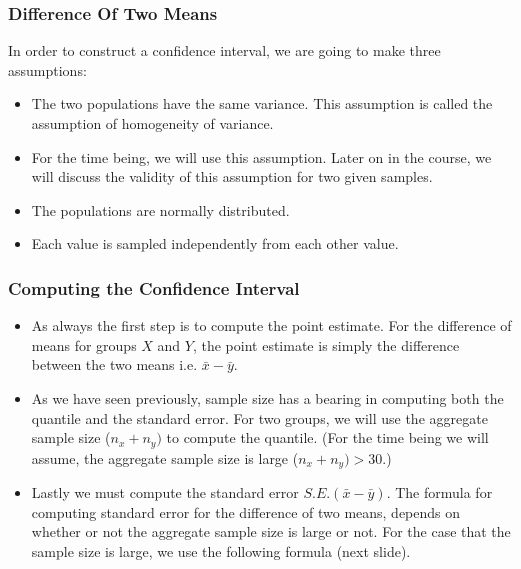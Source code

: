 \begin{frame}
\frametitle{Difference Of Two Means}
In order to construct a confidence interval, we are going to make three assumptions:

\begin{itemize}
\item The two populations have the same variance. This assumption is called the assumption of homogeneity of variance.
\item For the time being, we will use this assumption. Later on in the course, we will discuss the validity of this assumption for two given samples.
\item The populations are normally distributed.
\item Each value is sampled independently from each other value.
\end{itemize}
\end{frame}

\begin{frame}
\frametitle{Computing the Confidence Interval}

\begin{itemize}
\item As always the first step is to compute the point estimate. For the difference of means for groups $X$ and $Y$, the point estimate is simply the difference between the two means i.e. $\bar{x} - \bar{y}$.

\item As we have seen previously, sample size has a bearing in computing both the quantile and the standard error.
For two groups, we will use the aggregate sample size ($n_x+n_y)$ to compute the quantile. (For the time being we will assume, the aggregate sample size is large ($n_x+n_y)> 30$.)

\item Lastly we must compute the standard error $S.E.(\bar{x}-\bar{y})$. The formula for computing standard error for the difference of two means, depends on whether or not the aggregate sample size is large or not. For the case that the sample size is large, we use the following formula (next slide).
\end{itemize}
\end{frame}

